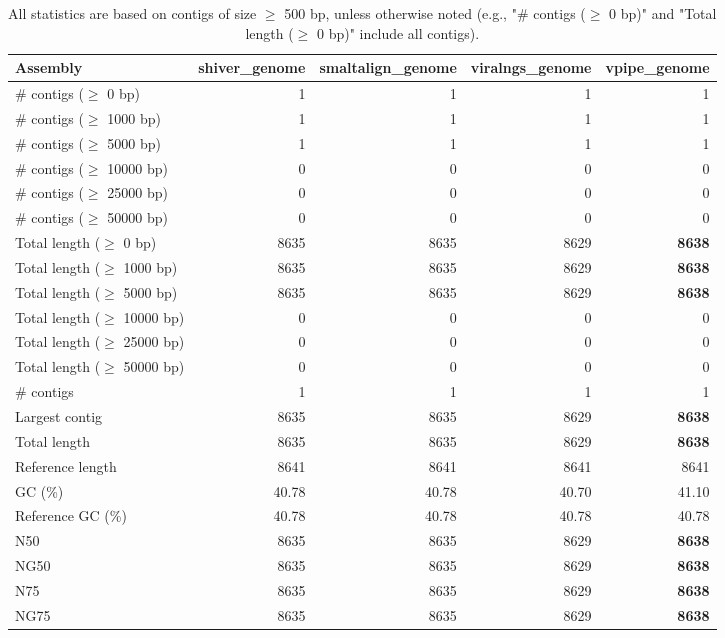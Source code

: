 \documentclass[12pt,a4paper]{article}
\begin{document}
\begin{table}[ht]
\begin{center}
\caption{All statistics are based on contigs of size $\geq$ 500 bp, unless otherwise noted (e.g., "\# contigs ($\geq$ 0 bp)" and "Total length ($\geq$ 0 bp)" include all contigs).}
\begin{tabular}{|l*{4}{|r}|}
\hline
Assembly & shiver\_genome & smaltalign\_genome & viralngs\_genome & vpipe\_genome \\ \hline
\# contigs ($\geq$ 0 bp) & 1 & 1 & 1 & 1 \\ \hline
\# contigs ($\geq$ 1000 bp) & 1 & 1 & 1 & 1 \\ \hline
\# contigs ($\geq$ 5000 bp) & 1 & 1 & 1 & 1 \\ \hline
\# contigs ($\geq$ 10000 bp) & 0 & 0 & 0 & 0 \\ \hline
\# contigs ($\geq$ 25000 bp) & 0 & 0 & 0 & 0 \\ \hline
\# contigs ($\geq$ 50000 bp) & 0 & 0 & 0 & 0 \\ \hline
Total length ($\geq$ 0 bp) & 8635 & 8635 & 8629 & {\bf 8638} \\ \hline
Total length ($\geq$ 1000 bp) & 8635 & 8635 & 8629 & {\bf 8638} \\ \hline
Total length ($\geq$ 5000 bp) & 8635 & 8635 & 8629 & {\bf 8638} \\ \hline
Total length ($\geq$ 10000 bp) & 0 & 0 & 0 & 0 \\ \hline
Total length ($\geq$ 25000 bp) & 0 & 0 & 0 & 0 \\ \hline
Total length ($\geq$ 50000 bp) & 0 & 0 & 0 & 0 \\ \hline
\# contigs & 1 & 1 & 1 & 1 \\ \hline
Largest contig & 8635 & 8635 & 8629 & {\bf 8638} \\ \hline
Total length & 8635 & 8635 & 8629 & {\bf 8638} \\ \hline
Reference length & 8641 & 8641 & 8641 & 8641 \\ \hline
GC (\%) & 40.78 & 40.78 & 40.70 & 41.10 \\ \hline
Reference GC (\%) & 40.78 & 40.78 & 40.78 & 40.78 \\ \hline
N50 & 8635 & 8635 & 8629 & {\bf 8638} \\ \hline
NG50 & 8635 & 8635 & 8629 & {\bf 8638} \\ \hline
N75 & 8635 & 8635 & 8629 & {\bf 8638} \\ \hline
NG75 & 8635 & 8635 & 8629 & {\bf 8638} \\ \hline

\end{tabular}
\end{center}
\end{table}
\end{document}
